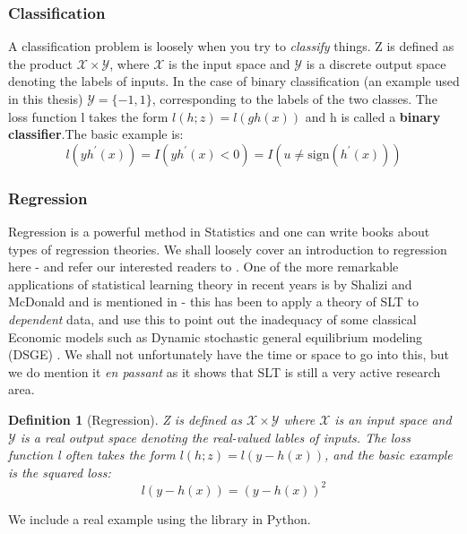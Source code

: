 \documentclass[12pt, oneside, a4paper]{article}
\theoremstyle{plain}
\newtheorem{definition}[theorem]{Definition}
\theoremstyle{definition}
\newcommand{\lt}{<}
\begin{document}
\subsubsection{Classification}
A classification problem is loosely when you try to \textit{classify} things.
Z is defined as the product $\mathcal{X} \times \mathcal{Y}$, where $\mathcal{X}$ is the input space and $\mathcal{Y}$
is a discrete output space denoting the labels of inputs. In the case of binary classification (an example used in this thesis)
$\mathcal{Y} = \lbrace -1, 1 \rbrace$, corresponding to the labels of the two classes. The loss function l takes the form
$l(h ; z) = l(gh(x))$ and h is called a \textbf{binary classifier}.The basic example is:
\begin{equation}
 l(yh^{'}(x)) = I(yh^{'}(x) \lt 0) = I(u \neq \mathrm{sign}(h^{'}(x)))
\end{equation}
\subsubsection{Regression}
Regression is a powerful method in Statistics and one can write books about types of regression theories. We shall
loosely cover an introduction to regression here - and refer our interested readers to \cite{mcquarrie1998regression}. 
One of the more remarkable applications of statistical learning theory in recent years is by Shalizi and McDonald and
is mentioned in \cite{McDonald_TimeSeries} - this has been to apply a theory of SLT to \textit{dependent} data, and use 
this to point out the inadequacy of some classical Economic models such as Dynamic stochastic general equilibrium modeling (DSGE)
\cite{romer2011advanced}. We shall not unfortunately have the time 
or space to go into this, but we do mention it \textit{en passant} as it shows that SLT is still a very active research area.
\begin{definition}[Regression]
 Z is defined as $\mathcal{X} \times \mathcal{Y}$ where $\mathcal{X}$ is an input space and $\mathcal{Y}$ is a real output
space denoting the real-valued lables of inputs. The loss function l often takes the form $l(h ;z) = l(y-h(x))$,
and the basic example is the squared loss:
\begin{equation}
 l(y-h(x)) = (y - h(x))^2
\end{equation}
 
\end{definition}
We include a real example using the \cite{scikit-learn} library in Python.
\end{document}
